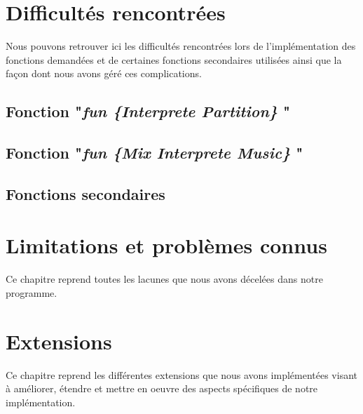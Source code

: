 \documentclass[12pt, a4paper]{report}
\begin{document}
\chapter{Difficultés rencontrées}
	Nous pouvons retrouver ici les difficultés rencontrées lors de l'implémentation des fonctions demandées et de certaines fonctions secondaires utilisées ainsi que la façon dont nous avons géré ces complications.
	
\section{Fonction "\textit{fun \{Interprete Partition\} }"}


\section{Fonction "\textit{fun \{Mix Interprete Music\} }"}


\section{Fonctions secondaires}


\chapter{Limitations et problèmes connus}
	Ce chapitre reprend toutes les lacunes que nous avons décelées dans notre programme. 



\chapter{Extensions}
	Ce chapitre reprend les différentes extensions que nous avons implémentées visant à améliorer, étendre et mettre en oeuvre des aspects spécifiques de notre implémentation.
\end{document}
